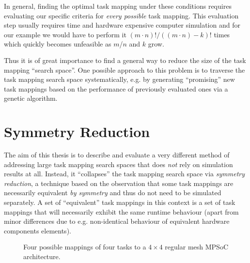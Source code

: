 In general, finding the optimal task mapping under these conditions requires
evaluating our specific criteria for \textit{every possible} task mapping. This
evaluation step usually requires time and hardware expensive computer
simulation and for our example we would have to perform it $(m \cdot n)! / ((m
\cdot n) - k)!$ times which quickly becomes unfeasible as $m$/$n$ and $k$ grow.

Thus it is of great importance to find a general way to reduce the size of the
task mapping ``search space''. One possible approach to this problem is to
traverse the task mapping search space systematically, e.g. by generating
``promising'' new task mappings based on the performance of previously
evaluated ones via a genetic algorithm.

\section{Symmetry Reduction}
\label{sec:mot_symmetry_reduction}

The aim of this thesis is to describe and evaluate a very different method of
addressing large task mapping search spaces that does \textit{not} rely on
simulation results at all. Instead, it ``collapses'' the task mapping search
space via \textit{symmetry reduction}, a technique based on the observation
that some task mappings are necessarily equivalent \textit{by symmetry} and
thus do not need to be simulated separately. A set of ``equivalent'' task
mappings in this context is a set of task mappings that will necessarily
exhibit the same runtime behaviour (apart from minor differences due to e.g.
non-identical behaviour of equivalent hardware components elements).

\begin{figure}
  \centering
  \begin{subfigure}{.4\textwidth}
    \caption{}
  \end{subfigure}
  \hspace*{\fill}
  \begin{subfigure}{.4\textwidth}
    \caption{}
  \end{subfigure}
  \begin{subfigure}{.4\textwidth}
    \caption{}
  \end{subfigure}
  \hspace*{\fill}
  \begin{subfigure}{.4\textwidth}
    \caption{}
  \end{subfigure}
  \caption{Four possible mappings of four tasks to a $4 \times 4$ regular mesh
           MPSoC architecture.}
  \label{fig:regular_mesh_4_4_mappings}
\end{figure}

